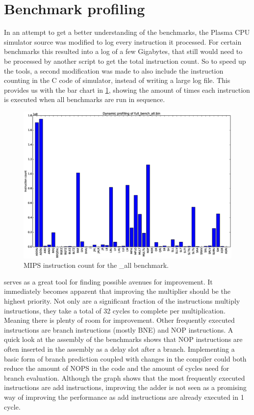 \documentclass[final]{article}
\begin{document}
\section{Benchmark profiling}
\label{sec:benchprof}

In an attempt to get a better understanding of the benchmarks, the Plasma CPU simulator source was modified to log every instruction it processed.
For certain benchmarks this resulted into a log of a few Gigabytes, that still would need to be processed by another script to get the total instruction count.
So to speed up the tools, a second modification was made to also include the instruction counting in the C code of simulator, instead of writing a large log file.
This provides us with the bar chart in \cref{fig:instruction-count}, showing the amount of times each instruction is executed when all benchmarks are run in sequence.

\begin{figure}[H]
\centering
\centerline{\includegraphics[width=1.2\textwidth]{resources/bar-chart.eps}}
\caption{MIPS instruction count for the \_all benchmark.}
\label{fig:instruction-count}
\end{figure}

 serves as a great tool for finding possible avenues for improvement.
It immediately becomes apparent that improving the multiplier should be the highest priority.
Not only are a significant fraction of the instructions multiply instructions, they take a total of 32 cycles to complete per multiplication.
Meaning there is plenty of room for improvement.
Other frequently executed instructions are branch instructions (mostly BNE) and NOP instructions.
A quick look at the assembly of the benchmarks shows that NOP instructions are often inserted in the assembly as a delay slot after a branch.
Implementing a basic form of branch prediction coupled with changes in the compiler could both reduce the amount of NOPS in the code and the amount of cycles need for branch evaluation.
Although the graph shows that the most frequently executed instructions are add instructions, improving the adder is not seen as a promising way of improving the performance as add instructions are already executed in 1 cycle.
\end{document}
